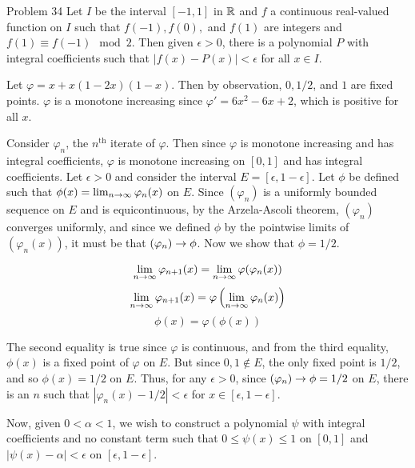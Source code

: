 \documentclass{hmwk}
\begin{document}
\maketitle

\begin{problem}{Problem 34}
Let $I$ be the interval $[-1, 1]$ in $\mathbb{R}$ and $f$ a continuous real-valued function on $I$ such that $f(-1), f(0),$ and $f(1)$ are integers and $f(1) \equiv f(-1) \mod 2$. Then given $\epsilon > 0$, there is a polynomial $P$ with integral coefficients such that $|f(x) - P(x)| < \epsilon$ for all $x \in I$. 
\end{problem}

\begin{solution}

\pre Let $\varphi = x + x(1 - 2x)(1 - x)$. Then by observation, $0, 1/2$, and $1$ are fixed points. $\varphi$ is a monotone increasing since $\varphi' = 6x^2 - 6x + 2$, which is positive for all $x$. 

\pre Consider $\varphi_n$, the $n^\text{th}$ iterate of $\varphi$. Then since $\varphi$ is monotone increasing and has integral coefficients, $\varphi$ is monotone increasing on $[0, 1]$ and has integral coefficients. Let $\epsilon > 0$ and consider the interval $E = [\epsilon, 1 - \epsilon]$. Let $\phi$ be defined such that $\phi(x) = \lim_{n\rightarrow\infty}\varphi_n(x)$ on $E$. Since $(\varphi_n)$ is a uniformly bounded sequence on $E$ and is equicontinuous, by the Arzela-Ascoli theorem, $(\varphi_n)$ converges uniformly, and since we defined $\phi$ by the pointwise limits of $(\varphi_n(x))$, it must be that $(\varphi_n) \rightarrow \phi$. Now we show that $\phi = 1/2$. 


    $$\lim_{n\rightarrow\infty}\varphi_{n+1}(x) = \lim_{n\rightarrow\infty}\varphi(\varphi_n(x))$$
     $$\lim_{n\rightarrow\infty}\varphi_{n+1}(x) = \varphi\left(\lim_{n\rightarrow\infty}\varphi_n(x)\right)$$
    $$\phi(x) = \varphi(\phi(x))$$

\pre The second equality is true since $\varphi$ is continuous, and from the third equality, $\phi(x)$ is a fixed point of $\varphi$ on $E$. But since $0, 1 \notin E$, the only fixed point is $1/2$, and so $\phi(x) = 1/2$ on $E$. Thus, for any $\epsilon > 0$, since $(\varphi_n) \rightarrow \phi = 1/2$ on $E$, there is an $n$ such that $|\varphi_n(x) - 1/2 | < \epsilon$ for $x \in [\epsilon, 1 - \epsilon]$.

\pre Now, given $0 < \alpha < 1$, we wish to construct a polynomial $\psi$ with integral coefficients and no constant term such that $0 \leq \psi(x) \leq 1$ on $[0, 1]$ and $|\psi(x) - \alpha| < \epsilon$ on $[\epsilon, 1 - \epsilon]$.


\end{solution}
\end{document}
